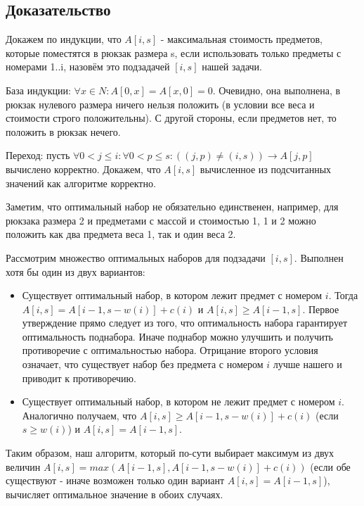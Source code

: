 \documentclass{article}
\begin{document}
	
	\subsection{Доказательство}
	
	Докажем по индукции, что $A[i, s]$ - максимальная стоимость предметов, которые поместятся в рюкзак размера s, если использовать только предметы с номерами 1..i, назовём это подзадачей $[i, s]$ нашей задачи.
	
	База индукции: $\forall x \in N: A[0, x] = A[x, 0] = 0$. Очевидно, она выполнена, в рюкзак нулевого размера ничего нельзя положить (в условии все веса и стоимости строго положительны). С другой стороны, если предметов нет, то положить в рюкзак нечего.
	
	Переход: пусть $\forall 0 < j \leq i: \forall 0 < p \leq s : ((j, p) \neq (i, s)) \rightarrow A[j, p]$ вычислено корректно. Докажем, что $A[i, s]$ вычисленное из подсчитанных значений как алгоритме корректно. 
	
	Заметим, что оптимальный набор не обязательно единственен, например, для рюкзака размера 2 и предметами с массой и стоимостью 1, 1 и 2 можно положить как два предмета веса 1, так и один веса 2. 
	
	Рассмотрим множество оптимальных наборов для подзадачи $[i, s]$. Выполнен хотя бы один из двух вариантов:
	
	\begin{itemize}
		\item Существует оптимальный набор, в котором лежит предмет с номером $i$. Тогда $A[i, s] = A[i - 1, s - w(i)] + c(i)$ и $A[i, s] \geq A[i - 1, s]$. Первое утверждение прямо следует из того, что оптимальность набора гарантирует оптимальность поднабора. Иначе поднабор можно улучшить и получить противоречие с оптимальностью набора. Отрицание второго условия означает, что существует набор без предмета с номером $i$ лучше нашего и приводит к противоречию.
		\item Существует оптимальный набор, в котором не лежит предмет с номером $i$. Аналогично получаем, что $A[i, s] \geq A[i - 1, s - w(i)] + c(i)$ (если $s \geq w(i)$) и $A[i, s] = A[i - 1, s]$.
	\end{itemize}
	
	Таким образом, наш алгоритм, который по-сути выбирает максимум из двух величин $A[i, s] = max(A[i - 1, s], A[i - 1, s - w(i)] + c(i))$ (если обе существуют - иначе возможен только один вариант $A[i, s] = A[i - 1, s]$), вычисляет оптимальное значение в обоих случаях. 
	
\end{document}
